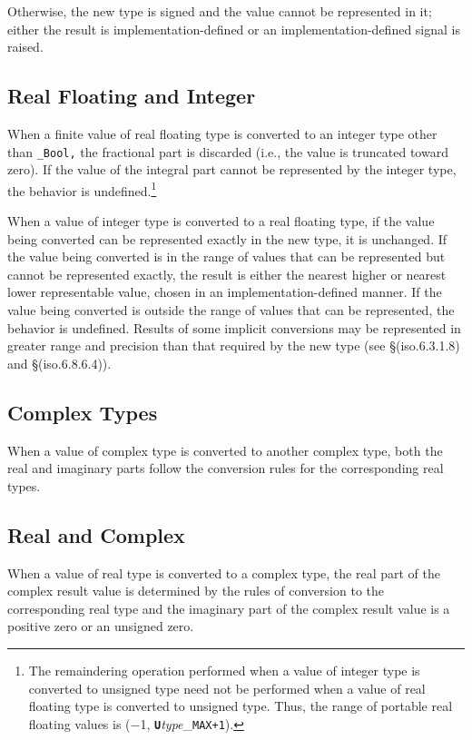 Otherwise, the new type is signed and the value cannot be represented in it;
either the result is implementation-defined or an implementation-defined signal
is raised.

\subsection{Real Floating and Integer}
When a finite value of real floating type is converted to an integer type other
than \texttt{\_Bool,} the fractional part is discarded (i.e., the value is
truncated toward zero). If the value of the integral part cannot be represented
by the integer type, the behavior is undefined.\footnote{The remaindering
  operation performed when a value of integer type is converted to unsigned
  type need not be performed when a value of real floating type is converted to
  unsigned type. Thus, the range of portable real floating values is (−1,
  \texttt{\textbf{U}}\textit{type}\_\texttt{MAX+1}).}

When a value of integer type is converted to a real floating type, if the value
being converted can be represented exactly in the new type, it is unchanged. If
the value being converted is in the range of values that can be represented but
cannot be represented exactly, the result is either the nearest higher or
nearest lower representable value, chosen in an implementation-defined
manner. If the value being converted is outside the range of values that can be
represented, the behavior is undefined. Results of some implicit conversions
may be represented in greater range and precision than that required by the new
type (see \S(iso.6.3.1.8) and \S(iso.6.8.6.4)).

\subsection{Complex Types}
When a value of complex type is converted to another complex type, both the
real and imaginary parts follow the conversion rules for the corresponding real
types.

\subsection{Real and Complex}
When a value of real type is converted to a complex type, the real part of the
complex result value is determined by the rules of conversion to the
corresponding real type and the imaginary part of the complex result value is a
positive zero or an unsigned zero.

